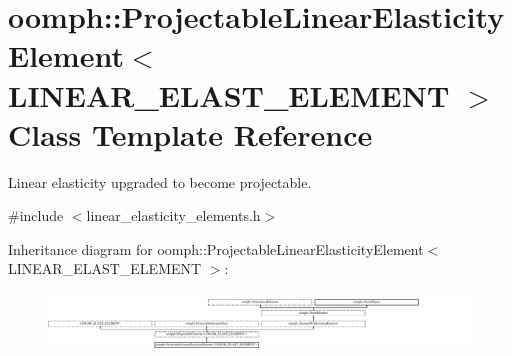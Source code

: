 \hypertarget{classoomph_1_1ProjectableLinearElasticityElement}{}\section{oomph\+:\+:Projectable\+Linear\+Elasticity\+Element$<$ L\+I\+N\+E\+A\+R\+\_\+\+E\+L\+A\+S\+T\+\_\+\+E\+L\+E\+M\+E\+NT $>$ Class Template Reference}
\label{classoomph_1_1ProjectableLinearElasticityElement}


Linear elasticity upgraded to become projectable.  




{\ttfamily \#include $<$linear\+\_\+elasticity\+\_\+elements.\+h$>$}

Inheritance diagram for oomph\+:\+:Projectable\+Linear\+Elasticity\+Element$<$ L\+I\+N\+E\+A\+R\+\_\+\+E\+L\+A\+S\+T\+\_\+\+E\+L\+E\+M\+E\+NT $>$\+:\begin{figure}[H]
\begin{center}
\leavevmode
\includegraphics[height=1.605505cm]{classoomph_1_1ProjectableLinearElasticityElement}
\end{center}
\end{figure}
